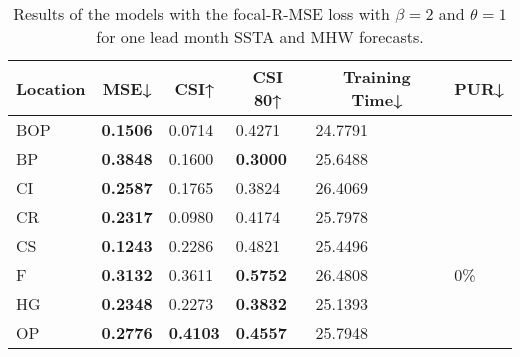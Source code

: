 \documentclass[11pt, a4paper]{article}
\begin{document}
\begin{table}[H]
\centering
\small
\caption{Results of the models with the focal-R-MSE loss with $\beta=2$ and $\theta=1$ for one lead month SSTA and MHW forecasts.}\label{tb:focal}
\begin{tabular}{llllll}
\multicolumn{1}{c}{\textbf{Location}} & \multicolumn{1}{c}{\textbf{MSE↓}} & \multicolumn{1}{c}{\textbf{CSI↑}} & \multicolumn{1}{c}{\textbf{CSI 80↑}} & \multicolumn{1}{c}{\textbf{Training Time↓}} & \multicolumn{1}{c}{\textbf{PUR↓}} \\ \hline
BOP                         & \textbf{0.1506}                   & 0.0714                            & 0.4271                               & 24.7791                                     &                                   \\
BP                        & \textbf{0.3848}                   & 0.1600                            & \textbf{0.3000}                      & 25.6488                                     &                                   \\
CI                        & \textbf{0.2587}                   & 0.1765                            & 0.3824                               & 26.4069                                     &                                   \\
CR                           & \textbf{0.2317}                   & 0.0980                            & 0.4174                               & 25.7978                                     &                                   \\
CS                           & \textbf{0.1243}                   & 0.2286                            & 0.4821                               & 25.4496                                     &                                   \\
F                             & \textbf{0.3132}                   & 0.3611                            & \textbf{0.5752}                      & 26.4808                                     & 0\%                               \\
HG                          & \textbf{0.2348}                   & 0.2273                            & \textbf{0.3832}                      & 25.1393                                     &                                   \\
OP                       & \textbf{0.2776}                   & \textbf{0.4103}                   & \textbf{0.4557}                      & 25.7948                                     &                                   \\

\end{tabular}
\end{table}
\end{document}
